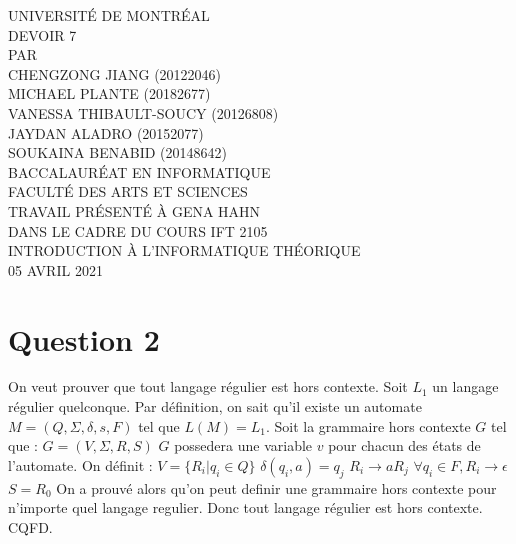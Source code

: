 \documentclass{article}
\begin{document}
\begin{titlepage}
    \begin{center}
        \textsc{\large UNIVERSITÉ DE MONTRÉAL}\\[3.5cm]
        
        \textsc{\large DEVOIR 7}\\[2.5cm]
       
        \textsc{\large PAR}\\
        \textsc{\large CHENGZONG JIANG (20122046)}\\
        \textsc{\large MICHAEL PLANTE (20182677)}\\
        \textsc{\large VANESSA THIBAULT-SOUCY (20126808)}\\
        \textsc{\large JAYDAN ALADRO (20152077)}\\
        \textsc{\large SOUKAINA BENABID (20148642)}\\[3.5cm]
        
        
        \textsc{\large BACCALAURÉAT EN INFORMATIQUE}\\
        \textsc{\large FACULTÉ DES ARTS ET SCIENCES}\\[3.5cm]
        
        \textsc{\large TRAVAIL PRÉSENTÉ À GENA HAHN}\\
        \textsc{\large DANS LE CADRE DU COURS IFT 2105}\\
        \textsc{\large INTRODUCTION À L'INFORMATIQUE THÉORIQUE}\\[3cm]
        
        \textsc{\large 05 AVRIL 2021}\\
    \end{center}
\end{titlepage}
\section*{Question 2}
\large On veut prouver que tout langage régulier est hors contexte.
\newline 
\newline Soit $L_1$ un langage régulier quelconque. Par définition, on sait qu'il existe un automate $M=(Q,\Sigma,\delta,s,F)$ tel que $L(M)=L_1$. 
\newline 
\newline Soit la grammaire hors contexte $G$ tel que : $G=(V,\Sigma,R,S)$
\newline $G$ possedera une variable $v$ pour chacun des états de l'automate. 
\newline On définit : 
\newline $V=\{R_i | q_i \in Q\}$
\newline $\delta(q_i,a)=q_j$
\newline $R_i \rightarrow aR_j$
\newline $\forall q_i \in F, R_i \rightarrow \epsilon$
\newline $S=R_0$
\newline 
\newline On a prouvé alors qu'on peut definir une grammaire hors contexte pour n'importe quel langage regulier. Donc tout langage régulier est hors contexte. CQFD.
\end{document}
